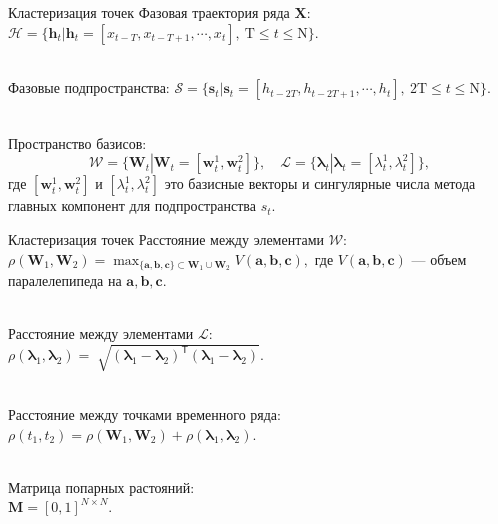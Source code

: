\documentclass{beamer}
\begin{document}
\begin{frame}{Кластеризация точек}
Фазовая траектория ряда $\textbf{X}$:
$\mathcal{H} = \{\textbf{h}_t| \textbf{h}_t = [x_{t-T}, x_{t-T+1}, \cdots, x_{t}],~\text{T}\leq t\leq \text{N}\}.$

~\\
Фазовые подпространства:
$\mathcal{S} = \{\textbf{s}_t| \textbf{s}_t = [h_{t-2T}, h_{t-2T+1}, \cdots, h_{t}],~\text{2T}\leq t\leq \text{N}\}.$

~\\
Пространство базисов:
$$\mathcal{W} = \{\textbf{W}_{t}| \textbf{W}_t = [\textbf{w}^1_t, \textbf{w}^2_t]\}, \quad \mathcal{L} = \{\bm{\lambda}_t| \bm{\lambda}_t=[\lambda^1_t, \lambda^2_t]\}, $$
где $[\textbf{w}^1_t, \textbf{w}^2_t]$ и $[\lambda^1_t, \lambda^2_t]$ это базисные векторы и сингулярные числа метода главных компонент для подпространства $s_t$.
\end{frame}
\begin{frame}{Кластеризация точек}
Расстояние между элементами $\mathcal{W}$:\\
$\rho\left(\textbf{W}_1, \textbf{W}_2\right) = \max_{\{\textbf{a},\textbf{b},\textbf{c}\} \subset \textbf{W}_1\cup \textbf{W}_2 } V\left(\textbf{a},\textbf{b},\textbf{c}\right),$
где $V\left(\textbf{a},\textbf{b},\textbf{c}\right)$ --- объем паралелепипеда на $\textbf{a}, \textbf{b}, \textbf{c}$.

~\\
Расстояние между элементами $\mathcal{L}$:\\
$\rho\left(\bm{\lambda}_1, \bm{\lambda}_2\right) = \sqrt[]{\left(\bm{\lambda}_1 - \bm{\lambda}_2\right)^{\mathsf{T}}\left(\bm{\lambda}_1 - \bm{\lambda}_2\right)}.$

~\\
Расстояние между точками временного ряда:\\
$\rho\left(t_1, t_2\right) = \rho\left(\textbf{W}_1, \textbf{W}_2\right) + \rho\left(\bm{\lambda}_1, \bm{\lambda}_2\right).$

~\\
Матрица попарных растояний:\\
$\textbf{M} = [0, 1]^{N\times N}.$

\end{frame}
\end{document}
